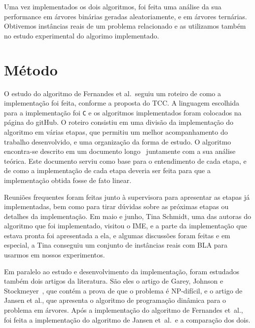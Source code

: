 \documentclass[a4paper,12pt]{article}
\begin{document}
Uma vez implementados os dois algoritmos, foi feita uma análise 
da sua performance em árvores binárias geradas aleatoriamente, e 
em árvores ternárias.
Obtivemos instâncias reais de um problema relacionado e as 
utilizamos também no estudo experimental do algorimo implementado.
 

\newpage



\section{Método}

O estudo do algoritmo de Fernandes et al.\ seguiu um roteiro de
como a implementação foi feita, conforme a proposta do TCC. 
A linguagem escolhida para a implementação foi \texttt{C} e os 
algoritmos implementados foram colocados na página do gitHub. 
O roteiro consistiu em uma divisão da implementação do algoritmo 
em várias etapas, que permitiu um melhor acompanhamento do 
trabalho desenvolvido, e uma organização da forma de estudo. 
O algoritmo encontra-se descrito em um documento 
longo~\cite{Schmidt15} juntamente com a sua análise teórica. 
Este documento serviu como base para o entendimento de cada 
etapa, e de como a implementação de cada etapa deveria ser feita 
para que a implementação obtida fosse de fato linear. 

Reuniões frequentes foram feitas junto à supervisora para 
apresentar as etapas já implementadas, bem como para tirar dúvidas 
sobre as próximas etapas ou detalhes da implementação. 
Em maio e junho, Tina Schmidt, uma das autoras do algoritmo que 
foi implementado, visitou o IME, e a parte da 
implementação que estava pronta foi apresentada a ela, e 
algumas discussões foram feitas e em especial, a Tina conseguiu
um conjunto de instâncias reais com BLA para usarmos em nossos
experimentos.   

Em paralelo ao estudo e desenvolvimento da implementação, foram 
estudados também dois artigos da literatura. São eles o artigo 
de Garey, 
Johnson e Stockmeyer~\cite{GareyJS76}, que contém a prova de que o 
problema é NP-difícil, e o artigo de Jansen et al., que apresenta 
o algoritmo de programação dinâmica para o problema em árvores. 
Após a implementação do algoritmo de Fernandes et~al., foi feita 
a implementação do algoritmo de Jansen et~al.\ e a comparação dos 
dois. 
\end{document}
